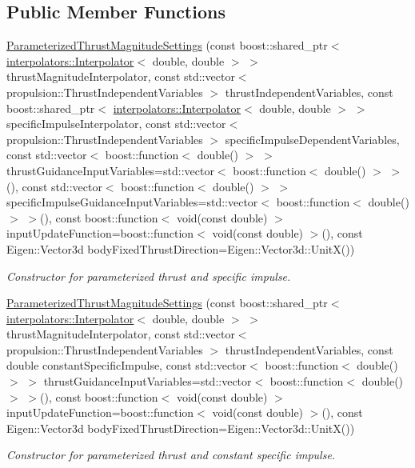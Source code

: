 \subsection*{Public Member Functions}
\begin{DoxyCompactItemize}
\item 
\hyperlink{classtudat_1_1simulation__setup_1_1ParameterizedThrustMagnitudeSettings_a35cf9d1771df030daf0d4eb11f3f7086}{Parameterized\+Thrust\+Magnitude\+Settings} (const boost\+::shared\+\_\+ptr$<$ \hyperlink{classtudat_1_1interpolators_1_1Interpolator}{interpolators\+::\+Interpolator}$<$ double, double $>$ $>$ thrust\+Magnitude\+Interpolator, const std\+::vector$<$ propulsion\+::\+Thrust\+Independent\+Variables $>$ thrust\+Independent\+Variables, const boost\+::shared\+\_\+ptr$<$ \hyperlink{classtudat_1_1interpolators_1_1Interpolator}{interpolators\+::\+Interpolator}$<$ double, double $>$ $>$ specific\+Impulse\+Interpolator, const std\+::vector$<$ propulsion\+::\+Thrust\+Independent\+Variables $>$ specific\+Impulse\+Dependent\+Variables, const std\+::vector$<$ boost\+::function$<$ double() $>$ $>$ thrust\+Guidance\+Input\+Variables=std\+::vector$<$ boost\+::function$<$ double() $>$ $>$(), const std\+::vector$<$ boost\+::function$<$ double() $>$ $>$ specific\+Impulse\+Guidance\+Input\+Variables=std\+::vector$<$ boost\+::function$<$ double() $>$ $>$(), const boost\+::function$<$ void(const double) $>$ input\+Update\+Function=boost\+::function$<$ void(const double) $>$(), const Eigen\+::\+Vector3d body\+Fixed\+Thrust\+Direction=Eigen\+::\+Vector3d\+::\+UnitX())
\begin{DoxyCompactList}\small\item\em Constructor for parameterized thrust and specific impulse. \end{DoxyCompactList}\item 
\hyperlink{classtudat_1_1simulation__setup_1_1ParameterizedThrustMagnitudeSettings_a97acca3bedf261ec857e60b681ea2864}{Parameterized\+Thrust\+Magnitude\+Settings} (const boost\+::shared\+\_\+ptr$<$ \hyperlink{classtudat_1_1interpolators_1_1Interpolator}{interpolators\+::\+Interpolator}$<$ double, double $>$ $>$ thrust\+Magnitude\+Interpolator, const std\+::vector$<$ propulsion\+::\+Thrust\+Independent\+Variables $>$ thrust\+Independent\+Variables, const double constant\+Specific\+Impulse, const std\+::vector$<$ boost\+::function$<$ double() $>$ $>$ thrust\+Guidance\+Input\+Variables=std\+::vector$<$ boost\+::function$<$ double() $>$ $>$(), const boost\+::function$<$ void(const double) $>$ input\+Update\+Function=boost\+::function$<$ void(const double) $>$(), const Eigen\+::\+Vector3d body\+Fixed\+Thrust\+Direction=Eigen\+::\+Vector3d\+::\+UnitX())
\begin{DoxyCompactList}\small\item\em Constructor for parameterized thrust and constant specific impulse. \end{DoxyCompactList}\end{DoxyCompactItemize}
